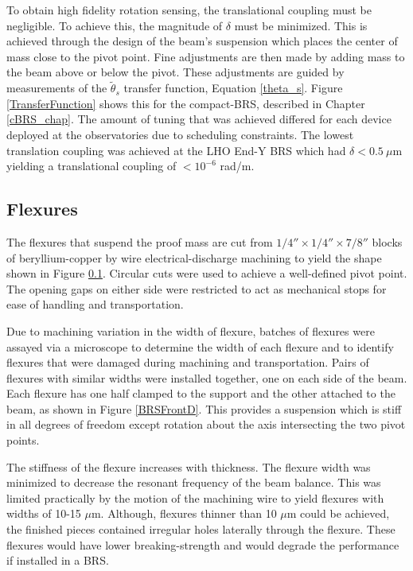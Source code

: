 \documentclass [12pt, proquest]{uwthesis}[2019]
\begin{document}
To obtain high fidelity rotation sensing, the translational coupling must be negligible. To achieve this, the magnitude of $\delta$ must be minimized. This is achieved through the design of the beam's suspension which places the center of mass close to the pivot point. Fine adjustments are then made by adding mass to the beam above or below the pivot. These adjustments are guided by measurements of the $\tilde{\theta}_s$ transfer function, Equation \ref{theta_s}. Figure \ref{TransferFunction} shows this for the compact-BRS, described in Chapter \ref{cBRS_chap}. The amount of tuning that was achieved differed for each device deployed at the observatories due to scheduling constraints. The lowest translation coupling was achieved at the LHO End-Y BRS which had $\delta<0.5\ \mu$m yielding a translational coupling of $<10^{-6}$ rad/m.

\subsection{Flexures}\label{flex}

The flexures that suspend the proof mass are cut from $1/4''\times1/4''\times7/8''$ blocks of beryllium-copper by wire electrical-discharge machining to yield the shape shown in Figure \ref{flex}. Circular cuts were used to achieve a well-defined pivot point. The opening gaps on either side were restricted to act as mechanical stops for ease of handling and transportation.

Due to machining variation in the width of flexure, batches of flexures were assayed via a microscope to determine the width of each flexure and to identify flexures that were damaged during machining and transportation. Pairs of flexures with similar widths were installed together, one on each side of the beam. Each flexure has one half clamped to the support and the other attached to the beam, as shown in Figure \ref{BRSFrontD}. This provides a suspension which is stiff in all degrees of freedom except rotation about the axis intersecting the two pivot points. 

The stiffness of the flexure increases with thickness. The flexure width was minimized to decrease the resonant frequency of the beam balance. This was limited practically by the motion of the machining wire to yield flexures with widths of 10-15 $\mu$m. Although, flexures thinner than 10 $\mu$m could be achieved, the finished pieces contained irregular holes laterally through the flexure. These flexures would have lower breaking-strength and would degrade the performance if installed in a BRS. 
\end{document}
